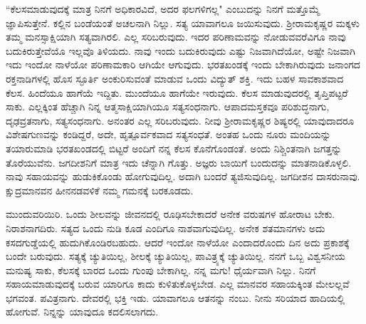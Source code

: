 ``ಕೆಲಸಮಾಡುವುದಕ್ಕೆ ಮಾತ್ರ ನಿನಗೆ ಅಧಿಕಾರವಿದೆ, ಅದರ ಫಲಗಳಿಗಲ್ಲ" ಎಂಬುದನ್ನು ನಿನಗೆ ಮತ್ತೊಮ್ಮೆ ಜ್ಞಾಪಿಸುತ್ತೇನೆ. ಕಲ್ಲಿನ ಬಂಡೆಯಂತೆ ಅಚಲನಾಗಿ ನಿಲ್ಲು. ಸತ್ಯ ಯಾವಾಗಲೂ ಜಯಿಸುವುದು. ಶ‍್ರೀರಾಮಕೃಷ್ಣರ ಮಕ್ಕಳು ತಮ್ಮ ಮನಸ್ಸಾಕ್ಷಿಯಾಗಿ ಸತ್ಯವಾಗಿರಲಿ. ಎಲ್ಲ ಸರಿಬರುವುದು. ಇದರ ಪರಿಣಾಮವನ್ನು ನೋಡುವವರೆವಿಗೂ ನಾವು ಬದುಕಿರುತ್ತೇವೆಯೊ ಇಲ್ಲವೊ ತಿಳಿಯದು. ನಾವು ಇಂದು ಬದುಕಿರುವುದು ಎಷ್ಟು ನಿಜವಾಗಿದೆಯೋ, ಅಷ್ಟೇ ನಿಜವಾಗಿ ಇದು ಇಂದೋ ನಾಳೆಯೋ ಪರಿಣಾಮಕಾರಿ ಆಗಿಯೇ ಆಗುವುದು. ಭರತಖಂಡಕ್ಕೆ ಇಂದು ಬೇಕಾಗಿರುವುದು ಜನಾಂಗದ ರಕ್ತನಾಡಿಗಳಲ್ಲಿ ಹೊಸ ಸ್ಫೂರ್ತಿ ಅಂಕುರಿಸುವಂತೆ ಮಾಡುವ ಒಂದು ವಿದ್ಯುತ್ ಶಕ್ತಿ. ಇದು ಬಹಳ ಸಾವಕಾಶವಾದ ಕೆಲಸ. ಹಿಂದೆಯೂ ಹಾಗೆಯೆ ಇದ್ದಿತು. ಮುಂದೆಯೂ ಹಾಗೆಯೇ ಇರುವುದು. ಕೆಲಸ ಮಾಡುವುದರಲ್ಲಿ ತೃಪ್ತಿಪಟ್ಟರೆ ಸಾಕು. ಎಲ್ಲಕ್ಕಿಂತ ಹೆಚ್ಚಾಗಿ ನಿನ್ನ ಆತ್ಮಸಾಕ್ಷಿಯಾಗಿಯೂ ಸತ್ಯಸಂಧನಾಗು. ಆಪಾದಮಸ್ತಕವೂ ಪರಿಶುದ್ಧನಾಗು, ದೃಢವ್ರತನಾಗು, ಸತ್ಯಸಂಧನಾಗು. ಅನಂತರ ಎಲ್ಲ ಸರಿಬರುವುದು. ನೀವು ಶ‍್ರೀರಾಮಕೃಷ್ಣರ ಶಿಷ್ಯರಲ್ಲಿ ಯಾವುದಾದರೂ ವಿಶೇಷಗುಣವನ್ನು ಕಂಡಿದ್ದರೆ, ಅದೇ, ಹೃತ್ಪೂರ್ವಕವಾದ ಸತ್ಯಸಂಧತೆ. ಅಂತಹ ಒಂದು ನೂರು ಮಂದಿಯನ್ನು ತಯಾರುಮಾಡಿ ಭರತಖಂಡದಲ್ಲಿ ಬಿಟ್ಟರೆ ಅಂದಿಗೆ ನನ್ನ ಕೆಲಸ ಕೊನೆಗೊಂಡಂತೆ. ಅಂದು ನಿಶ್ಚಿಂತನಾಗಿ ಜಗತ್ತನ್ನು ತೊರೆಯುವೆನು. ಜಗದೀಶನಿಗೆ ಮಾತ್ರ ಇದು ಚೆನ್ನಾಗಿ ಗೊತ್ತು. ಅಜ್ಞರು ಬಾಯಿಗೆ ಬಂದುದನ್ನು ಮಾತನಾಡಿಕೊಳ್ಳಲಿ. ನಾವು ಸಹಾಯವನ್ನು ಹುಡುಕಿಕೊಂಡು ಹೋಗುವುದಿಲ್ಲ. ಅದಾಗಿ ಬಂದರೆ ತ್ಯಜಿಸುವುದಿಲ್ಲ. ಜಗದೀಶನ ದಾಸರುನಾವು. ಕ್ಷುದ್ರಮಾನವನ ಹೀನನಡವಳಿಕೆ ನಮ್ಮ ಗಮನಕ್ಕೆ ಬರಕೂಡದು.

ಮುಂದುವರಿಯಿರಿ. ಒಂದು ಶೀಲವನ್ನು ಜೀವನದಲ್ಲಿ ರೂಢಿಸಬೇಕಾದರೆ ಅನೇಕ ವರುಷಗಳ ಹೋರಾಟ ಬೇಕು. ನಿರಾಶನಾಗದಿರು. ಸತ್ಯದ ಒಂದು ನುಡಿ ಕೂಡ ಎಂದಿಗೂ ನಾಶವಾಗುವುದಿಲ್ಲ. ಅನೇಕ ಶತಮಾನಗಳು ಅದು ಕಸದಗುಡ್ಡೆಯಲ್ಲಿ ಹುದುಗಿಕೊಂಡಿರಬಹುದು. ಆದರೆ ಇಂದೋ ನಾಳೆಯೋ ಎಂದಾದರೊಂದು ದಿನ ಅದು ಪ್ರಕಾಶಕ್ಕೆ ಬಂದೇ ಬರುವುದು. ಸತ್ಯಕ್ಕೆ ಚ್ಯುತಿಯಿಲ್ಲ, ಶೀಲಕ್ಕೆ ಚ್ಯುತಿಯಿಲ್ಲ, ಪಾವಿತ್ರ್ಯಕ್ಕೆ ಚ್ಯುತಿಯಿಲ್ಲ. ನನಗೆ ಒಬ್ಬ ವಿಶ್ವಸನೀಯ ಮನುಷ್ಯ ಸಾಕು, ಕೆಲಸಕ್ಕೆ ಬಾರದ ಒಂದು ಗುಂಪು ಬೇಕಾಗಿಲ್ಲ. ನನ್ನ ಮಗು! ಧೈರ್ಯವಾಗಿ ನಿಲ್ಲು. ನಿನಗೆ ಸಹಾಯಮಾಡುವುದಕ್ಕೆ ಬರುವ ಯಾರಿಗೂ ಕಾದು ಕುಳಿತುಕೊಳ್ಳಬೇಡ. ಎಲ್ಲ ಮಾನವರ ಸಹಾಯಕ್ಕಿಂತ ಮೇಲಲ್ಲವೆ ಭಗವಂತ. ಪವಿತ್ರನಾಗು. ದೇವರಲ್ಲಿ ಭಕ್ತಿ ಇಡು. ಯಾವಾಗಲೂ ಆತನನ್ನು ನಂಬು. ನೀನು ಸರಿಯಾದ ಹಾದಿಯಲ್ಲಿ ಹೋಗುವೆ. ನಿನ್ನನ್ನು ಯಾವುದೂ ಕದಲಿಸಲಾಗದು.

